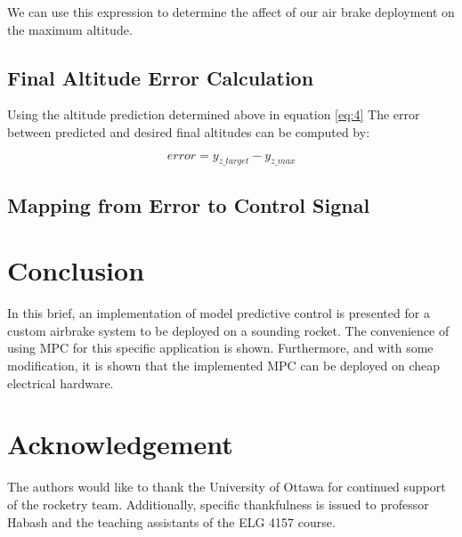 \documentclass[conference, letterpaper]{IEEEtran}
\begin{document}
We can use this expression to determine the affect of our air brake deployment on the maximum altitude.

\subsection{Final Altitude Error Calculation}

Using the altitude prediction determined above in equation \ref{eq:4} The error between predicted and desired final altitudes can be computed by:

\begin{equation}\label{eq:7}
  error =  y_{z\_target} - y_{z\_max}
\end{equation}


\subsection{Mapping from Error to Control Signal}

\section{Conclusion}

In this brief, an implementation of model predictive control is presented for a
custom airbrake system to be deployed on a sounding rocket. The convenience of
using MPC for this specific application is shown. Furthermore, and with some
modification, it is shown that the implemented MPC can be deployed on cheap electrical
hardware.

\section{Acknowledgement}

The authors would like to thank the University of Ottawa for continued support of the
rocketry team. Additionally, specific thankfulness is issued to professor Habash and
the teaching assistants of the ELG 4157 course.



\end{document}
